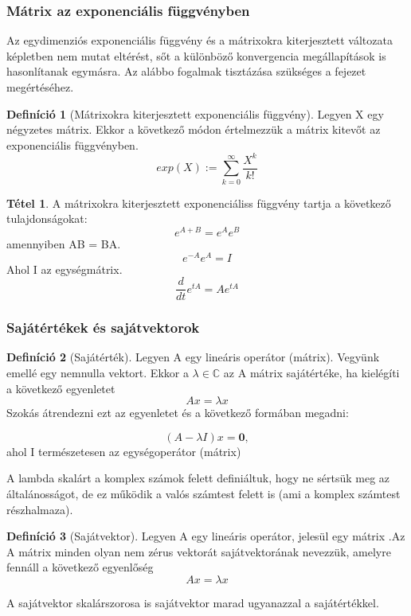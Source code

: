 \documentclass{article}
\theoremstyle{definition}
\theoremstyle{theorem}
\newtheorem{definition}{Definíció}
\newtheorem{theorem}{Tétel}
\begin{document}
\subsubsection{Mátrix az exponenciális függvényben}
Az egydimenziós exponenciális függvény és a mátrixokra kiterjesztett változata képletben nem mutat eltérést, sőt a különböző konvergencia megállapítások is hasonlítanak egymásra. Az alábbo fogalmak tisztázása szükséges a fejezet megértéséhez.
\begin{definition}[Mátrixokra kiterjesztett exponenciális függvény]
Legyen X egy négyzetes mátrix. Ekkor a következő módon értelmezzük a mátrix kitevőt az exponenciális függvényben.
\begin{equation*}
    exp(X) := \sum_{k=0}^{\infty} \frac{X^k}{k!}
\end{equation*}
\end{definition}
\begin{theorem}
A mátrixokra kiterjesztett exponenciáliss függvény tartja a következő tulajdonságokat:
        \begin{equation*}
            e^{A+B} = e^A  e^B
        \end{equation*}
        amennyiben AB = BA.
        \begin{equation*}
            e^{-A} e^{A} = I
        \end{equation*}
        Ahol I az egységmátrix.
        \begin{equation*}
            \frac{d}{dt} e^{tA} = A e^{tA}
        \end{equation*}
\end{theorem}
\subsubsection{Sajátértékek és sajátvektorok}
\begin{definition}[Sajátérték]
Legyen A egy lineáris operátor (mátrix). Vegyünk emellé egy nemnulla vektort. Ekkor a $ \lambda \in \mathbb{C}$ az A mátrix sajátértéke, ha kielégíti a következő egyenletet
\begin{equation*}
    Ax = \lambda x
\end{equation*}
Szokás átrendezni ezt az egyenletet és a következő formában megadni:

\begin{equation*}
    (A-\lambda I)x= \textbf{0},
\end{equation*}
ahol I természetesen az egységoperátor (mátrix)
\end{definition}
A lambda skalárt a komplex számok felett definiáltuk, hogy ne sértsük meg az általánosságot, de ez működik a valós számtest felett is (ami a komplex számtest részhalmaza).
\begin{definition}[Sajátvektor]
Legyen A egy lineáris operátor, jelesül egy mátrix .Az A mátrix minden olyan nem zérus  vektorát sajátvektorának nevezzük, amelyre fennáll a következő egyenlőség
\begin{equation*}
    Ax = \lambda x
\end{equation*}
\end{definition}
A sajátvektor skalárszorosa is sajátvektor marad ugyanazzal a sajátértékkel.
\end{document}
